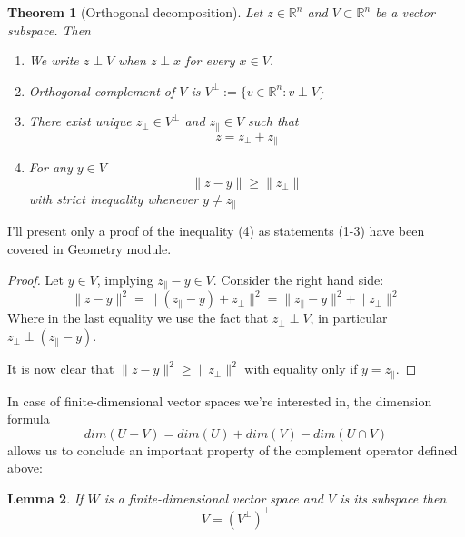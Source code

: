 \documentclass[a4paper]{article}
\theoremstyle{break}
\newtheorem{theorem}{Theorem}[section]
\newtheorem{lemma}[theorem]{Lemma}
\newcommand{\R}{\mathbb{R}}
\newcommand{\pll}{\parallel}
\begin{document}
\begin{theorem}[Orthogonal decomposition] \label{thm:projection}
    Let $z \in \R^n$ and $V \subset \R^n$ be a vector subspace. Then
    \begin{enumerate}
        \item We write $z \perp V$ when $ z \perp x$ for every $x \in V$.
        \item Orthogonal complement of $V$ is $V^\perp := \{ v \in \R^n : v \perp V\}$
        \item There exist unique $z_\perp \in V^\perp$ and $z_\pll \in V$ such that  
            \begin{equation}
                z = z_\perp + z_\pll
            \end{equation}
        \item For any $y \in V$
        \begin{equation}
                \| z - y \| \geq \| z_\perp \|
        \end{equation}
        with strict inequality whenever $y \neq z_\pll$
    \end{enumerate}
\end{theorem}
I'll present only a proof of the inequality (4) as statements (1-3) have been covered in Geometry module.
\begin{proof}
    Let $ y \in V $, implying $ z_\pll - y \in V$. Consider the right hand side:
    $$ \| z - y \|^2 = \| (z_\pll - y) + z_\perp \|^2 = \| z_\pll - y \|^2 + \| z_\perp \|^2 $$
    Where in the last equality we use the fact that $ z_\perp \perp V$,
    in particular $ z_\perp \perp (z_\pll - y)$.
    
    It is now clear that $ \| z - y \|^2 \geq \| z_\perp \|^2 $ with equality only if $ y = z_\pll$.
\end{proof}

In case of finite-dimensional vector spaces we're interested in, the dimension formula
\begin{equation}\label{eq:dim_formula}
    dim(U + V) = dim(U) + dim(V) - dim( U \cap V)
\end{equation}
allows us to conclude an important property of the complement operator defined above:

\begin{lemma}\label{lem:double_perp}
    If $W$ is a finite-dimensional vector space and $V$ is its subspace then
    $$ V = (V^\perp)^\perp $$
\end{lemma}
\end{document}
